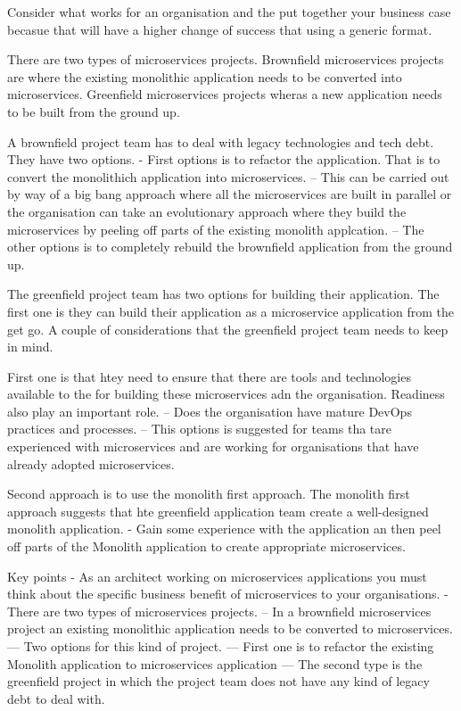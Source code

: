 Consider what works for an organisation and the put together your business case becasue that will have a higher change of success that using a generic format.


There are two types of microservices projects.
Brownfield microservices projects are where the existing monolithic application needs to be converted into microservices.
Greenfield microservices projects wheras a new application needs to be built from the ground up.

A brownfield project team has to deal with legacy technologies and tech debt. They have two options.
- First options is to refactor the application. That is to convert the monolithich application into microservices.
-- This can be carried out by way of a big bang approach where all the microservices are built in parallel or the organisation can take an evolutionary approach where they build the microservices by peeling off parts of the existing monolith applcation.
-- The other options is to completely rebuild the brownfield application from the ground up.

The greenfield project team has two options for building their application.
The first one is they can build their application as a microservice application from the get go.
A couple of considerations that the greenfield project team needs to keep in mind.

First one is that htey need to ensure that there are tools and technologies available to the for building these microservices adn the organisation.
Readiness also play an important role.
-- Does the organisation have mature DevOps practices and processes.
-- This options is suggested for teams tha tare experienced with microservices and are working for organisations that have already adopted microservices.

Second approach is to use the monolith first approach.
The monolith first approach suggests that hte greenfield application team create a well-designed monolith application.
- Gain some experience with the application an then peel off parts of the Monolith application to create appropriate microservices.

Key points
- As an architect working on microservices applications you must think about the specific business benefit of microservices to your organisations.
- There are two types of microservices projects.
-- In a brownfield microservices project an existing monolithic application needs to be converted to microservices.
--- Two options for this kind of project.
--- First one is to refactor the existing Monolith application to microservices application
--- The second type is the greenfield project in which the project team does not have any kind of legacy debt to deal with.

